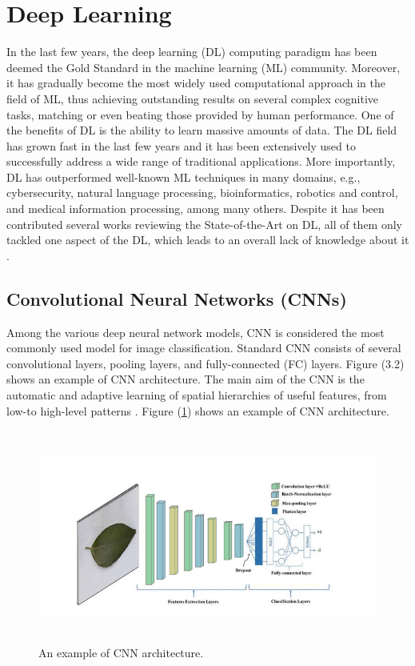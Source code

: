 \section{Deep Learning}

In the last few years, the deep learning (DL) computing paradigm has been 
deemed the Gold Standard in the machine learning (ML) community. Moreover,
it has gradually become the most widely used computational approach in the 
field of ML, thus achieving outstanding results on several complex cognitive 
tasks, matching or even beating those provided by human performance. One of 
the benefits of DL is the ability to learn massive amounts of data. The DL 
field has grown fast in the last few years and it has been extensively used 
to successfully address a wide range of traditional applications. More 
importantly, DL has outperformed well-known ML techniques in many domains, 
e.g., cybersecurity, natural language processing, bioinformatics, robotics 
and control, and medical information processing, among many others. Despite 
it has been contributed several works reviewing the State-of-the-Art on DL, 
all of them only tackled one aspect of the DL, which leads to an overall 
lack of knowledge about it \cite{alz21}.

\subsection{Convolutional Neural Networks (CNNs)}
Among the various deep neural network models, CNN is considered the most 
commonly used model for image classification. Standard CNN consists of 
several convolutional layers, pooling layers, and fully-connected (FC) 
layers. Figure (3.2) shows an example of CNN architecture. The main aim 
of the CNN is the automatic and adaptive learning of spatial hierarchies 
of useful features, from low-to high-level patterns \cite{esr20}.
Figure (\ref{fig:CNNArch}) shows an example of CNN architecture.

\begin{figure}[H]
    \centering
    \includegraphics[height=70mm]{photos/chapter03/2.png}
    \caption{An example of CNN architecture.}
    \label{fig:CNNArch}
\end{figure}

